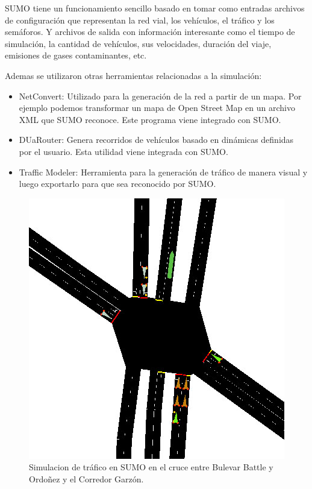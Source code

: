 SUMO tiene un funcionamiento sencillo basado en tomar como entradas archivos de configuración que representan la red vial, los vehículos, el tráfico y los semáforos. Y archivos de salida con información interesante como el tiempo de simulación, la cantidad de vehículos, sus velocidades, duración del viaje, emisiones de gases contaminantes, etc. 

Ademas se utilizaron otras herramientas relacionadas a la simulación:

\begin{itemize}
	
	\item  NetConvert: Utilizado para la generación de la red a partir de un mapa. Por ejemplo podemos transformar un mapa de Open Street Map en un archivo XML que SUMO reconoce. Este programa viene integrado con SUMO.
	\item DUaRouter: Genera recorridos de vehículos basado en dinámicas definidas por el usuario. Esta utilidad viene integrada con SUMO.
	\item Traffic Modeler: Herramienta para la generación de tráfico de manera visual y luego exportarlo para que sea reconocido por SUMO. \citep{TrafficModeler}
	
	
\end{itemize}

\begin{figure}[H]
	\centering
	\includegraphics[width=0.7\linewidth]{Figures/sim1}
	\caption{Simulacion de tráfico en SUMO en el cruce entre Bulevar Battle y Ordoñez y el Corredor Garzón.}
	\label{fig:sim1}
\end{figure}



